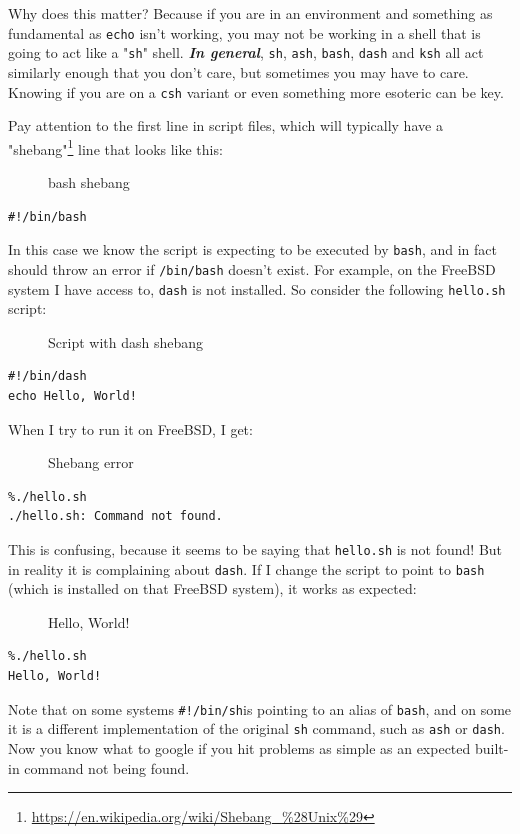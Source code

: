 \documentclass[10pt,]{book}
\renewcommand{\href}[2]{#2\footnote{\url{#1}}}
\numberwithin{figure}{chapter}
\DeclareRobustCommand{\drcap}[1]{\begin{figure}[H]\caption{#1}\end{figure}}
\DeclareRobustCommand{\drcmd}[1]{\index{Commands!#1}}
\DeclareRobustCommand{\drshl}[1]{\index{Shells!#1}}
\begin{document}
Why does this matter? Because if you are in an environment and something
as fundamental as \texttt{echo}\drcmd{echo} isn't working, you may not
be working in a shell that is going to act like a "\texttt{sh}" shell.
\textbf{\emph{In general}}, \texttt{sh}, \texttt{ash}, \texttt{bash},
\texttt{dash} and \texttt{ksh} all act similarly enough that you don't
care, but sometimes you may have to care. Knowing if you are on a
\texttt{csh}\drshl{csh} variant or even something more esoteric can be
key.

Pay attention to the first line in script files, which will typically
have a
\href{https://en.wikipedia.org/wiki/Shebang_\%28Unix\%29}{"shebang"}
line that looks like this:

\drcap{bash shebang}

\begin{verbatim}
#!/bin/bash
\end{verbatim}

In this case we know the script is expecting to be executed by
\texttt{bash}, and in fact should throw an error if \texttt{/bin/bash}
doesn't exist. For example, on the FreeBSD system I have access to,
\texttt{dash} is not installed. So consider the following
\texttt{hello.sh} script:

\drcap{Script with dash shebang}

\begin{verbatim}
#!/bin/dash
echo Hello, World!
\end{verbatim}

When I try to run it on FreeBSD, I get:

\drcap{Shebang error}

\begin{verbatim}
%./hello.sh
./hello.sh: Command not found.
\end{verbatim}

This is confusing, because it seems to be saying that \texttt{hello.sh}
is not found! But in reality it is complaining about \texttt{dash}. If I
change the script to point to \texttt{bash} (which is installed on that
FreeBSD system), it works as expected:

\drcap{Hello, World!}

\begin{verbatim}
%./hello.sh 
Hello, World!
\end{verbatim}

Note that on some systems \texttt{\#!/bin/sh}is pointing to an alias of
\texttt{bash}, and on some it is a different implementation of the
original \texttt{sh} command, such as \texttt{ash} or \texttt{dash}. Now
you know what to google if you hit problems as simple as an expected
built-in command not being found.
\end{document}
